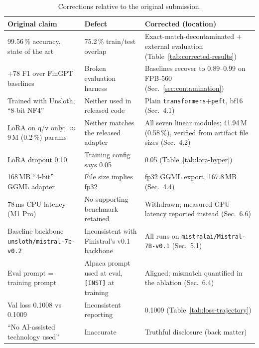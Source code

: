 \documentclass[a4paper]{article}
\begin{document}
\begin{table}[htbp]
\centering
\caption{Corrections relative to the original submission.}
\label{tab:corrections}
{\fontsize{8.5}{10.5}\selectfont
\begin{tabular}{p{4.2cm}p{4.6cm}p{4.6cm}}
\toprule
\textbf{Original claim} & \textbf{Defect} & \textbf{Corrected (location)} \\
\midrule
99.56\,\% accuracy, state of the art & 75.2\,\% train/test overlap & Exact-match-decontaminated + external evaluation (Table~\ref{tab:corrected-results}) \\
$+78$ F1 over FinGPT baselines & Broken evaluation harness & Baselines recover to 0.89--0.99 on FPB-560 (Sec.~\ref{sec:contamination}) \\
Trained with Unsloth, ``8-bit NF4'' & Neither used in released code & Plain \texttt{transformers}+\texttt{peft}, bf16 (Sec.~4.1) \\
LoRA on q/v only; $\approx$9\,M (0.2\,\%) params & Neither matches the released adapter & All seven linear modules; 41.94\,M (0.58\,\%), verified from artifact file sizes (Sec.~4.2) \\
LoRA dropout 0.10 & Training config says 0.05 & 0.05 (Table~\ref{tab:lora-hyper}) \\
168\,MB ``4-bit'' GGML adapter & File size implies fp32 & fp32 GGML export, 167.8\,MB (Sec.~4.4) \\
78\,ms CPU latency (M1 Pro) & No supporting benchmark retained & Withdrawn; measured GPU latency reported instead (Sec.~6.6) \\
Baseline backbone \texttt{unsloth/mistral-7b-v0.2} & Inconsistent with Finistral's v0.1 backbone & All runs on \texttt{mistralai/Mistral-7B-v0.1} (Sec.~5.1) \\
Eval prompt = training prompt & Alpaca prompt used at eval, \texttt{[INST]} at training & Aligned; mismatch quantified in the ablation (Sec.~6.4) \\
Val loss 0.1008 vs 0.1009 & Inconsistent reporting & 0.1009 (Table~\ref{tab:loss-trajectory}) \\
``No AI-assisted technology used'' & Inaccurate & Truthful disclosure (back matter) \\
\bottomrule
\end{tabular}}
\end{table}

\end{document}
